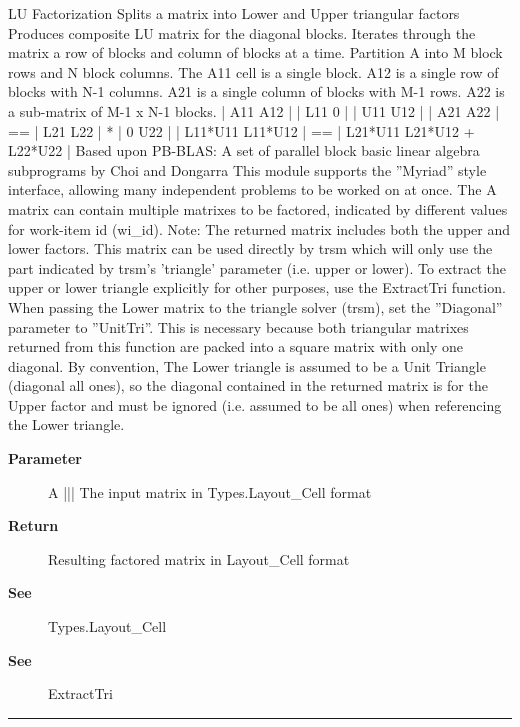 \par
LU Factorization Splits a matrix into Lower and Upper triangular factors Produces composite LU matrix for the diagonal blocks. Iterates through the matrix a row of blocks and column of blocks at a time. Partition A into M block rows and N block columns. The A11 cell is a single block. A12 is a single row of blocks with N-1 columns. A21 is a single column of blocks with M-1 rows. A22 is a sub-matrix of M-1 x N-1 blocks. | A11 A12 | | L11 0 | | U11 U12 | | A21 A22 | == | L21 L22 | * | 0 U22 | | L11*U11 L11*U12 | == | L21*U11 L21*U12 + L22*U22 | Based upon PB-BLAS: A set of parallel block basic linear algebra subprograms by Choi and Dongarra This module supports the ''Myriad'' style interface, allowing many independent problems to be worked on at once. The A matrix can contain multiple matrixes to be factored, indicated by different values for work-item id (wi\_id). Note: The returned matrix includes both the upper and lower factors. This matrix can be used directly by trsm which will only use the part indicated by trsm's 'triangle' parameter (i.e. upper or lower). To extract the upper or lower triangle explicitly for other purposes, use the ExtractTri function. When passing the Lower matrix to the triangle solver (trsm), set the ''Diagonal'' parameter to ''UnitTri''. This is necessary because both triangular matrixes returned from this function are packed into a square matrix with only one diagonal. By convention, The Lower triangle is assumed to be a Unit Triangle (diagonal all ones), so the diagonal contained in the returned matrix is for the Upper factor and must be ignored (i.e. assumed to be all ones) when referencing the Lower triangle.

\par
\begin{description}
\item [\textbf{Parameter}] A ||| The input matrix in Types.Layout\_Cell format
\item [\textbf{Return}] Resulting factored matrix in Layout\_Cell format
\item [\textbf{See}] Types.Layout\_Cell
\item [\textbf{See}] ExtractTri
\end{description}

\rule{\linewidth}{0.5pt}
